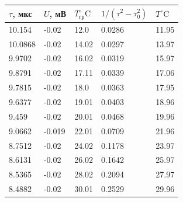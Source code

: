 \documentclass[12pt]{article}
\begin{document}
\begin{table}[h!]
\begin{center}
\begin{tabular}{|l|l|l|l|l|}
\hline
$\tau$, мкс                          & $U$, мВ                          & $T_{гр}^{\circ} \mathrm{C}$      & $1 / (\tau^2 - \tau_0^2)$      & $T^{\circ} \mathrm{C}$      \\ \hline
10.154                               & -0.02                            & 12.0             & 0.0286                         & 11.95       \\ \hline
10.0868                              & -0.02                            & 14.02            & 0.0297                         & 13.97       \\ \hline
9.9702                               & -0.02                            & 16.02            & 0.0319                         & 15.97       \\ \hline
9.8791                               & -0.02                            & 17.11            & 0.0339                         & 17.06       \\ \hline
9.7815                               & -0.02                            & 18.0             & 0.0363                         & 17.95       \\ \hline
9.6377                               & -0.02                            & 19.01            & 0.0403                         & 18.96       \\ \hline
9.459                                & -0.02                            & 20.01            & 0.0468                         & 19.96       \\ \hline
9.0662                               & -0.019                           & 22.01            & 0.0709                         & 21.96       \\ \hline
8.7512                               & -0.02                            & 24.02            & 0.1178                         & 23.97       \\ \hline
8.6131                               & -0.02                            & 26.02            & 0.1642                         & 25.97       \\ \hline
8.5365                               & -0.02                            & 28.02            & 0.2094                         & 27.97       \\ \hline
8.4882                               & -0.02                            & 30.01            & 0.2529                         & 29.96       \\ \hline

\end{tabular}
\end{center}
\end{table}
\end{document}
